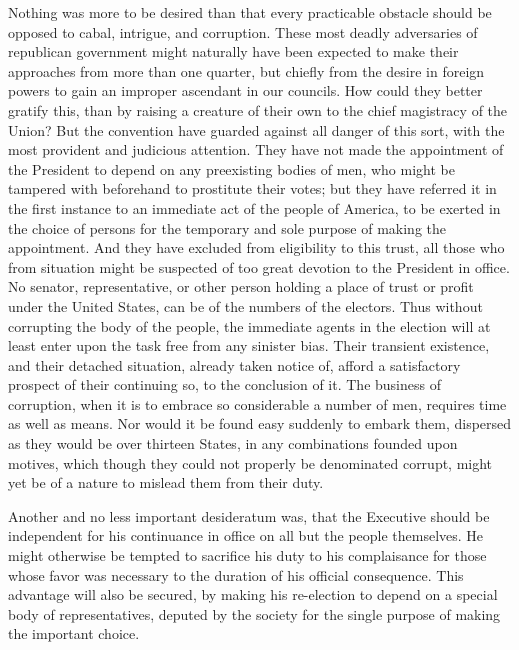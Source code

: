Nothing was more to be desired than that every practicable obstacle should be opposed to cabal, intrigue, and corruption. 
These most deadly adversaries of republican government might naturally have been expected to make their approaches from more than one quarter, but chiefly from the desire in foreign powers to gain an improper ascendant in our councils. 
How could they better gratify this, than by raising a creature of their own to the chief magistracy of the Union? 
But the convention have guarded against all danger of this sort, with the most provident and judicious attention. 
They have not made the appointment of the President to depend on any preexisting bodies of men, who might be tampered with beforehand to prostitute their votes; but they have referred it in the first instance to an immediate act of the people of America, to be exerted in the choice of persons for the temporary and sole purpose of making the appointment. 
And they have excluded from eligibility to this trust, all those who from situation might be suspected of too great devotion to the President in office. 
No senator, representative, or other person holding a place of trust or profit under the United States, can be of the numbers of the electors. 
Thus without corrupting the body of the people, the immediate agents in the election will at least enter upon the task free from any sinister bias. 
Their transient existence, and their detached situation, already taken notice of, afford a satisfactory prospect of their continuing so, to the conclusion of it. 
The business of corruption, when it is to embrace so considerable a number of men, requires time as well as means. 
Nor would it be found easy suddenly to embark them, dispersed as they would be over thirteen States, in any combinations founded upon motives, which though they could not properly be denominated corrupt, might yet be of a nature to mislead them from their duty.

Another and no less important desideratum was, that the Executive should be independent for his continuance in office on all but the people themselves. 
He might otherwise be tempted to sacrifice his duty to his complaisance for those whose favor was necessary to the duration of his official consequence. 
This advantage will also be secured, by making his re-election to depend on a special body of representatives, deputed by the society for the single purpose of making the important choice.

